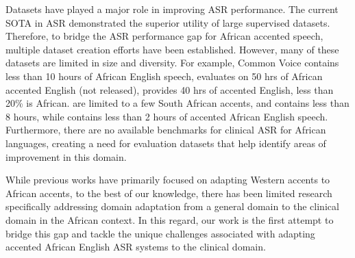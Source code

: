 \documentclass[11pt,a4paper]{article}
\begin{document}
Datasets have played a major role in improving ASR performance. The current SOTA in ASR \cite{radford2022robust} demonstrated the superior utility of large supervised datasets. 
Therefore, to bridge the ASR performance gap for African accented speech, multiple dataset creation efforts \citep{doumbouya2021using, siminyu2021ai4d, babirye2022building, ogayo2022building, gutkin2020developing, dossou2021okwugb, afonja2021learning, kamper2011multi,ibejih2022edustt} have been established. However, many of these datasets are limited in size and diversity. For example, Common Voice \citep{Ardila2020CommonVA} contains less than 10 hours of African English speech, \citet{li2021accent} evaluates on 50 hrs of African accented English (not released), \citet{sanabria2023edinburgh} provides 40 hrs of accented English, less than 20\% is African. \citet{kamper2011multi, de2007human} are limited to a few South African accents, and \citet{ibejih2022edustt} contains less than 8 hours, while \citet{afonja2021learning} contains less than 2 hours of accented African English speech. Furthermore, there are no available benchmarks for clinical ASR for African languages, creating a need for evaluation datasets that help identify areas of improvement in this domain. %

While previous works have primarily focused on adapting Western accents to African accents, to the best of our knowledge, there has been limited research specifically addressing domain adaptation from a general domain to the clinical domain in the African context. In this regard, our work is the first attempt to bridge this gap and tackle the unique challenges associated with adapting accented 
African English ASR systems to the clinical domain. %



\end{document}
